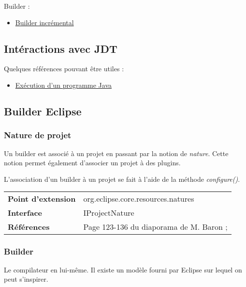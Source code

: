 \documentclass[letterpaper,10pt,french]{sphinxmanual}
\begin{document}
Builder :
\begin{itemize}
\item {} 
\href{http://help.eclipse.org/helios/index.jsp?topic=/org.eclipse.platform.doc.isv/guide/resAdv\_builders.htm}{Builder incrémental}

\end{itemize}


\subsection{Intéractions avec JDT}
\label{eclipse/index:interactions-avec-jdt}
Quelques références pouvant être utiles :
\begin{itemize}
\item {} 
\href{http://help.eclipse.org/helios/index.jsp?topic=/org.eclipse.jdt.doc.isv/guide/jdt\_api\_run.htm}{Exécution d'un programme Java}

\end{itemize}


\subsection{Builder Eclipse}
\label{eclipse/index:builder-eclipse}

\subsubsection{Nature de projet}
\label{eclipse/index:id1}
Un builder est associé à un projet en passant par la notion de \emph{nature}.
Cette notion permet également d'associer un projet à des plugins.

L'association d'un builder à un projet se fait à l'aide de la méthode
\emph{configure()}.

\begin{tabulary}{\linewidth}{|L|L|}
\hline

\textbf{Point d'extension}
 & 
org.eclipse.core.resources.natures
\\

\textbf{Interface}
 & 
IProjectNature
\\

\textbf{Références}
 & 
Page 123-136 du diaporama de M. Baron ;
\\
\hline
\end{tabulary}



\subsubsection{Builder}
\label{eclipse/index:builder}
Le compilateur en lui-même.
Il existe un modèle fourni par Eclipse sur lequel on peut s'inspirer.
\end{document}

